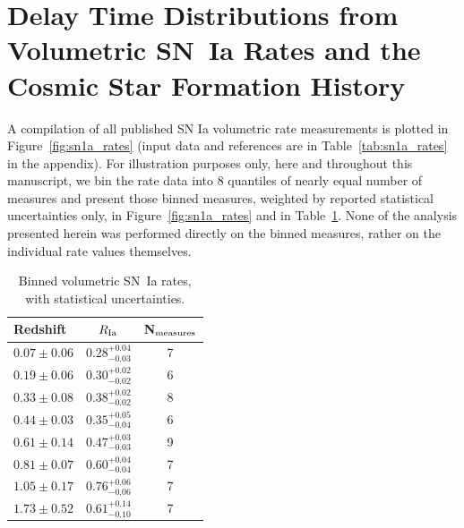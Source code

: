 \documentclass[apj, twocolumn]{aastex62}
\begin{document}
\section{Delay Time Distributions from Volumetric SN~Ia Rates and the Cosmic Star Formation History}\label{sec:rates}

A compilation of all published SN Ia volumetric rate measurements is plotted in Figure~\ref{fig:sn1a_rates} (input data and references are in Table~\ref{tab:sn1a_rates} in the appendix). For illustration purposes only, here and throughout this manuscript, we bin the rate data into 8 quantiles of nearly equal number of measures and present those binned measures, weighted by reported statistical uncertainties only, in Figure~\ref{fig:sn1a_rates} and in Table~\ref{tab:sn1a_bin}. None of the analysis presented herein was performed directly on the binned measures, rather on the individual rate values themselves.

\begin{table}[h]
   \centering
   \caption{Binned volumetric SN~Ia rates, with statistical uncertainties.}
   \begin{tabular}{lcc} 
   \hline
   \hline
   Redshift & $R_{\rm Ia}$\tablenotemark{a}&N$_{\rm measures}$\\
   \hline
$0.07 \pm{0.06}$ & $0.28^{+0.04}_{-0.03}$& 7\\
$0.19 \pm{0.06}$ & $0.30^{+0.02}_{-0.02}$& 6\\
$0.33 \pm{0.08}$ & $0.38^{+0.02}_{-0.02}$& 8\\
$0.44 \pm{0.03}$ & $0.35^{+0.05}_{-0.04}$& 6\\
$0.61 \pm{0.14}$ & $0.47^{+0.03}_{-0.03}$& 9\\
$0.81 \pm{0.07}$ & $0.60^{+0.04}_{-0.04}$& 7\\
$1.05 \pm{0.17}$ & $0.76^{+0.06}_{-0.06}$& 7\\
$1.73 \pm{0.52}$ & $0.61^{+0.14}_{-0.10}$& 7\\
\hline
   \end{tabular}
   \label{tab:sn1a_bin}
\end{table}
\end{document}
